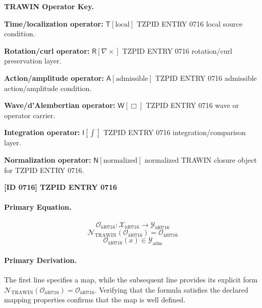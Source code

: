 \par\vspace{0.45\baselineskip}
\noindent\begin{minipage}[t]{\linewidth}
\begingroup
\small
\raggedright
\textbf{TRAWIN Operator Key.}\par
\noindent\textbf{Time/localization operator:} $\mathsf{T}\!\left[\mathrm{local}\right]$ TZPID ENTRY 0716 local source condition.\par
\noindent\textbf{Rotation/curl operator:} $\mathsf{R}\!\left[\nabla\times\right]$ TZPID ENTRY 0716 rotation/curl preservation layer.\par
\noindent\textbf{Action/amplitude operator:} $\mathsf{A}\!\left[\mathrm{admissible}\right]$ TZPID ENTRY 0716 admissible action/amplitude condition.\par
\noindent\textbf{Wave/d'Alembertian operator:} $\mathsf{W}\!\left[\Box\right]$ TZPID ENTRY 0716 wave or operator carrier.\par
\noindent\textbf{Integration operator:} $\mathsf{I}\!\left[\int\right]$ TZPID ENTRY 0716 integration/comparison layer.\par
\noindent\textbf{Normalization operator:} $\mathsf{N}\!\left[\mathrm{normalized}\right]$ normalized TRAWIN closure object for TZPID ENTRY 0716.\par
\endgroup
\end{minipage}

\clearpage
\noindent\textbf{[ID 0716] TZPID ENTRY 0716}\par
\vspace{0.35em}
\paragraph{Primary Equation.}
\[
\mathcal{O}_{\mathrm{id0716}}:\mathcal{X}_{\mathrm{id0716}}\longrightarrow\mathcal{Y}_{\mathrm{id0716}}
\]
\[
\mathcal{N}_{\mathrm{TRAWIN}}(\mathcal{O}_{\mathrm{id0716}})=\mathcal{O}_{\mathrm{id0716}}
\]
\[
\mathcal{O}_{\mathrm{id0716}}(x)\in\mathcal{Y}_{\mathrm{adm}}
\]

\paragraph{Primary Derivation.}
The first line specifies a map, while the subsequent line provides its explicit form \( \mathcal{N}_{\mathrm{TRAWIN}}(\mathcal{O}_{\mathrm{id0716}})=\mathcal{O}_{\mathrm{id0716}} \). Verifying that the formula satisfies the declared mapping properties confirms that the map is well defined.
